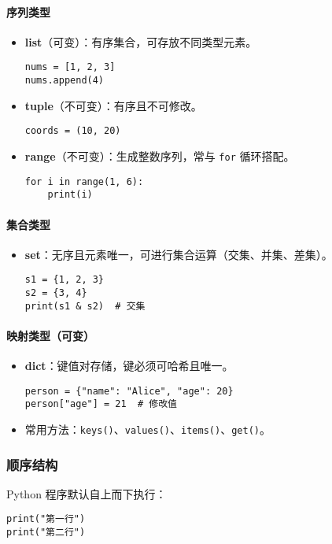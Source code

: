 \documentclass[a4paper,12pt]{ctexart}
\begin{document}
\paragraph{序列类型}
\begin{itemize}
  \item \textbf{list}（可变）：有序集合，可存放不同类型元素。
\begin{lstlisting}
nums = [1, 2, 3]
nums.append(4)
\end{lstlisting}
  \item \textbf{tuple}（不可变）：有序且不可修改。
\begin{lstlisting}
coords = (10, 20)
\end{lstlisting}
  \item \textbf{range}（不可变）：生成整数序列，常与 \texttt{for} 循环搭配。
\begin{lstlisting}
for i in range(1, 6):
    print(i)
\end{lstlisting}
\end{itemize}

\paragraph{集合类型}
\begin{itemize}
  \item \textbf{set}：无序且元素唯一，可进行集合运算（交集、并集、差集）。
\begin{lstlisting}
s1 = {1, 2, 3}
s2 = {3, 4}
print(s1 & s2)  # 交集
\end{lstlisting}
\end{itemize}

\paragraph{映射类型（可变）}
\begin{itemize}
  \item \textbf{dict}：键值对存储，键必须可哈希且唯一。
\begin{lstlisting}
person = {"name": "Alice", "age": 20}
person["age"] = 21  # 修改值
\end{lstlisting}
  \item 常用方法：\texttt{keys()}、\texttt{values()}、\texttt{items()}、\texttt{get()}。
\end{itemize}

\subsubsection{顺序结构}
Python 程序默认自上而下执行：
\begin{lstlisting}
print("第一行")
print("第二行")
\end{lstlisting}
\end{document}
